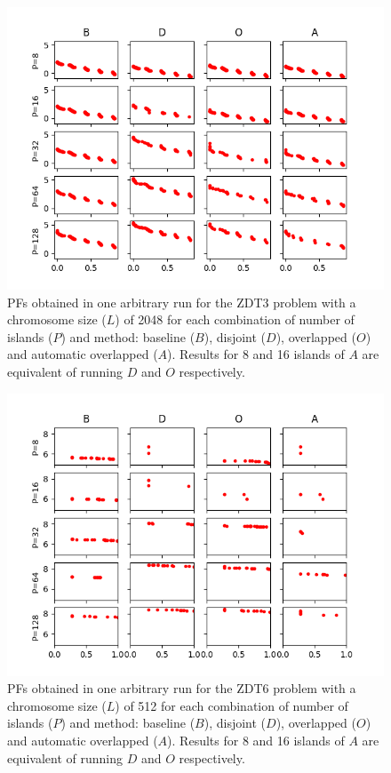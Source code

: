 \documentclass[preprint]{elsarticle}
\begin{document}
\begin{figure}
\centering
\includegraphics[width=12cm]{plot_zdt3_2048.png}
\caption{PFs obtained in one arbitrary run for the ZDT3 problem with a chromosome size ($L$) of 2048 for each combination of number of islands ($P$) and method: baseline ($B$), disjoint ($D$), overlapped ($O$) and automatic overlapped ($A$). Results for 8 and 16 islands of $A$ are equivalent of running $D$ and $O$ respectively. }
\label{fig:plot_zdt3_2048}
\end{figure}




\begin{figure}
\centering
\includegraphics[width=12cm]{plot_zdt6_512.png}
\caption{PFs obtained in one arbitrary run for the ZDT6 problem with a chromosome size ($L$) of 512 for each combination of number of islands ($P$) and method: baseline ($B$), disjoint ($D$), overlapped ($O$) and automatic overlapped ($A$). Results for 8 and 16 islands of $A$ are equivalent of running $D$ and $O$ respectively. }
\label{fig:plot_zdt6_512}
\end{figure}
\end{document}
